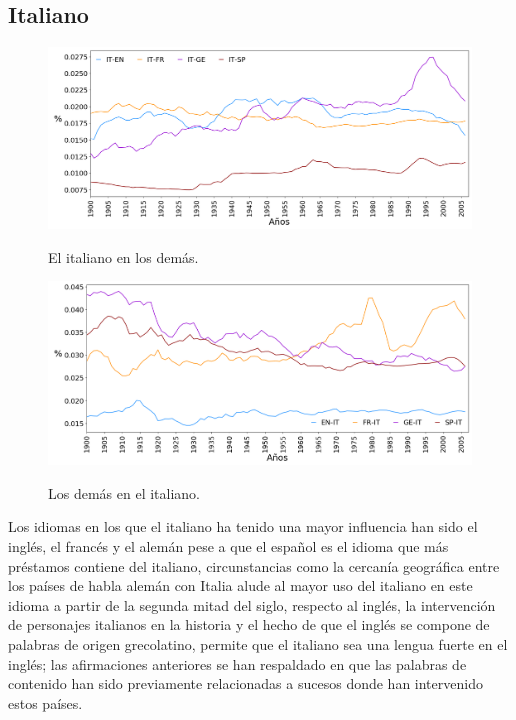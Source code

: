 \clearpage
\subsection{Italiano}

\begin{figure}
	\centering
	\includegraphics[scale=.36]{Cap_4/PF1_S2_IT.png}
	\label{fig.ST_a_IT}
	\caption{El italiano en los demás.}
\end{figure}
		
\begin{figure}[h!]
	\centering
	\includegraphics[scale=.36]{Cap_4/PF2_S2_IT.png}
	\label{fig.ST_b_IT}
	\caption{Los demás en el italiano.}
\end{figure}

\clearpage

Los idiomas en los que el italiano ha tenido una mayor influencia han sido el inglés, el francés y el alemán pese a que el español es el idioma que más préstamos contiene del  italiano,  circunstancias como la cercanía geográfica entre los países de habla alemán con Italia alude al  mayor uso del italiano en este idioma a partir de  la segunda mitad del siglo,  respecto al inglés,  la intervención de personajes  italianos en la historia y el hecho de que el inglés se compone de palabras de origen grecolatino,  permite que el italiano sea una lengua fuerte en el inglés;  las afirmaciones anteriores se han respaldado en que las palabras de contenido han sido previamente relacionadas  a sucesos donde han intervenido estos países.


